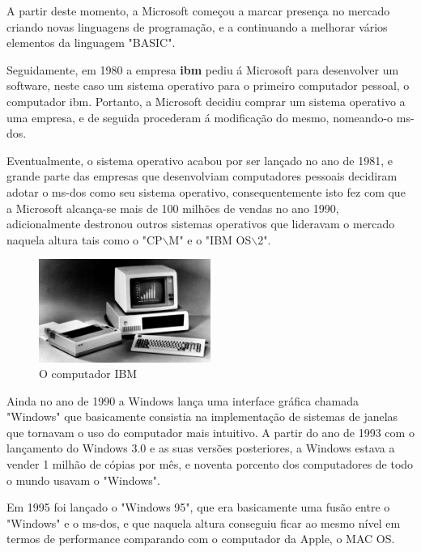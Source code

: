 \documentclass{report}
\begin{document}
A partir deste momento, a Microsoft começou a marcar presença no mercado criando novas linguagens de programação, e a continuando a melhorar vários elementos da linguagem "BASIC".

Seguidamente, em 1980 a empresa \textbf{\ac{ibm}} pediu á Microsoft para desenvolver um software, neste caso um sistema operativo para o primeiro computador pessoal, o computador \acs{ibm}. Portanto, a Microsoft decidiu comprar um sistema operativo a uma empresa, e de seguida procederam á modificação do mesmo, nomeando-o \ac{ms-dos}.

\vspace{5mm}

Eventualmente, o sistema operativo acabou por ser lançado no ano de 1981, e grande parte das empresas que desenvolviam computadores pessoais decidiram adotar o \acs{ms-dos} como seu sistema operativo, consequentemente isto fez com que a Microsoft alcança-se mais de 100 milhões de vendas no ano 1990, adicionalmente destronou outros sistemas operativos que lideravam o mercado naquela altura tais como o "CP$\backslash$M" e o "IBM OS$\backslash$2".

\vspace{5mm}

\begin{figure}[h!]
\includegraphics[width=0.5\textwidth]{IBM-Personal-Computer-machine-Microsoft-MS-DOS-operating-1981.jpg}
\centering
\caption{O computador IBM}
\end{figure}

\vspace{5mm}

Ainda no ano de 1990 a Windows lança uma interface gráfica  chamada "Windows" que basicamente consistia na  implementação de sistemas de janelas que tornavam o uso do computador mais intuitivo. A partir do ano de 1993 com o lançamento do Windows 3.0 e as suas versões posteriores, a Windows estava a vender 1 milhão de cópias por mês, e noventa porcento dos computadores de todo o mundo usavam o "Windows".

Em 1995 foi lançado o "Windows 95", que era basicamente uma fusão entre o "Windows" e o \acs{ms-dos}, e que naquela altura conseguiu ficar ao mesmo nível em termos de performance comparando com o computador da Apple, o MAC OS.
\end{document}
